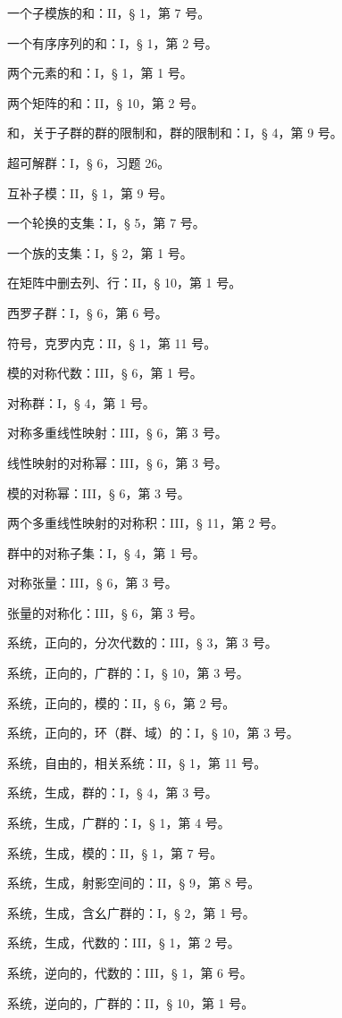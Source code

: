 一个子模族的和：II，§ 1，第 7 号。

一个有序序列的和：I，§ 1，第 2 号。

两个元素的和：I，§ 1，第 1 号。

两个矩阵的和：II，§ 10，第 2 号。

和，关于子群的群的限制和，群的限制和：I，§ 4，第 9 号。

超可解群：I，§ 6，习题 26。

互补子模：II，§ 1，第 9 号。

一个轮换的支集：I，§ 5，第 7 号。

一个族的支集：I，§ 2，第 1 号。

在矩阵中删去列、行：II，§ 10，第 1 号。

西罗子群：I，§ 6，第 6 号。

符号，克罗内克：II，§ 1，第 11 号。

模的对称代数：III，§ 6，第 1 号。

对称群：I，§ 4，第 1 号。

对称多重线性映射：III，§ 6，第 3 号。

线性映射的对称幂：III，§ 6，第 3 号。

模的对称幂：III，§ 6，第 3 号。

两个多重线性映射的对称积：III，§ 11，第 2 号。

群中的对称子集：I，§ 4，第 1 号。

对称张量：III，§ 6，第 3 号。

张量的对称化：III，§ 6，第 3 号。

系统，正向的，分次代数的：III，§ 3，第 3 号。

系统，正向的，广群的：I，§ 10，第 3 号。

系统，正向的，模的：II，§ 6，第 2 号。

系统，正向的，环（群、域）的：I，§ 10，第 3 号。

系统，自由的，相关系统：II，§ 1，第 11 号。

系统，生成，群的：I，§ 4，第 3 号。

系统，生成，广群的：I，§ 1，第 4 号。

系统，生成，模的：II，§ 1，第 7 号。

系统，生成，射影空间的：II，§ 9，第 8 号。

系统，生成，含幺广群的：I，§ 2，第 1 号。

系统，生成，代数的：III，§ 1，第 2 号。

系统，逆向的，代数的：III，§ 1，第 6 号。

系统，逆向的，广群的：II，§ 10，第 1 号。

